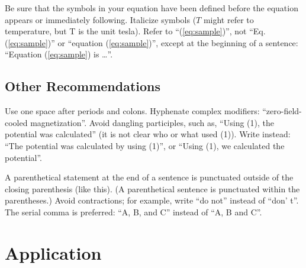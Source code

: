 \documentclass{ifacconf}
\begin{document}
Be sure that the symbols in your equation have been defined before the
equation appears or immediately following. Italicize symbols ($T$
might refer to temperature, but T is the unit tesla). Refer to
``(\ref{eq:sample})'', not ``Eq. (\ref{eq:sample})'' or ``equation
(\ref{eq:sample})'', except at the beginning of a sentence: ``Equation
(\ref{eq:sample}) is \ldots''.

\subsection{Other Recommendations}

Use one space after periods and colons. Hyphenate complex modifiers:
``zero-field-cooled magnetization''. Avoid dangling participles, such
as, ``Using (1), the potential was calculated'' (it is not clear who or
what used (1)). Write instead: ``The potential was calculated by using
(1)'', or ``Using (1), we calculated the potential''.

A parenthetical statement at the end of a sentence is punctuated
outside of the closing parenthesis (like this). (A parenthetical
sentence is punctuated within the parentheses.) Avoid contractions;
for example, write ``do not'' instead of ``don' t''. The serial comma
is preferred: ``A, B, and C'' instead of ``A, B and C''.
\section{Application}
\end{document}
